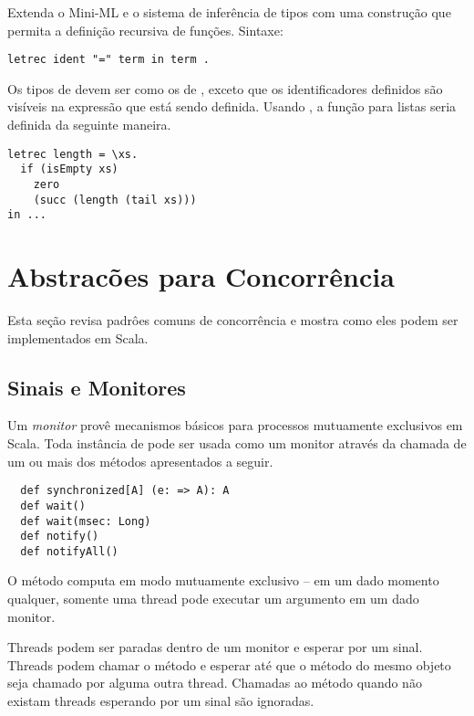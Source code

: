 \begin{exercise}\label{execcise:hm-extend} Extenda o  Mini-ML e o sistema de inferência de tipos
com uma construção  que permita a definição recursiva de funções. 
Sintaxe:
\begin{lstlisting}
letrec ident "=" term in term .
\end{lstlisting}
Os tipos de  devem ser como os de , 
exceto que os identificadores definidos são visíveis na expressão que está sendo definida. Usando , a função  
para listas seria definida da seguinte maneira.
\begin{lstlisting}
letrec length = \xs.
  if (isEmpty xs)
    zero
    (succ (length (tail xs)))
in ...
\end{lstlisting}
\end{exercise}

\chapter{Abstracões para Concorrência}\label{sec:ex-concurrency}

Esta seção revisa padrôes comuns de concorrência e mostra como eles
podem ser implementados em Scala.

\section{Sinais e Monitores}

\example
Um {\em monitor} provê mecanismos básicos para processos mutuamente exclusivos
em Scala. Toda instância de  pode ser usada como um monitor através
da chamada de um ou mais dos métodos apresentados a seguir.
\begin{lstlisting}
  def synchronized[A] (e: => A): A
  def wait()
  def wait(msec: Long)
  def notify()
  def notifyAll()
\end{lstlisting}
O método  computa  em modo mutuamente exclusivo --
em um dado momento qualquer, somente uma thread pode executar um argumento
 em um dado monitor.

Threads podem ser paradas dentro de um monitor e esperar por um sinal.  
Threads podem chamar o método  e esperar até que o método  do mesmo
objeto seja chamado por alguma outra thread. Chamadas ao método
 quando não existam threads esperando por um sinal são ignoradas.

